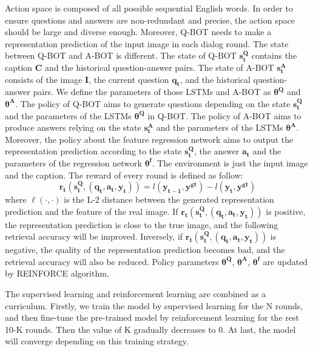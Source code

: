 \documentclass[review]{elsarticle}
\begin{document}
	Action space is composed of all possible sequential English words. In order to ensure questions and answers are non-redundant and precise, the action space should be large and diverse enough. 
	Moreover, Q-BOT needs to make a representation prediction of the input image in each dialog round. 
	The state between Q-BOT and A-BOT is different. The state of Q-BOT $\mathbf{s^{Q}_{t}}$ contains the caption $\textbf{C}$ and the historical question-answer pairs. The state of A-BOT $\mathbf{s^{A}_{t}}$ consists of the image $\textbf{I}$, the current question $\mathbf{q_{t}}$, and the historical question-answer pairs. 
	We define the parameters of those LSTMs and A-BOT as $\mathbf{\theta^{Q}}$ and $\mathbf{\theta^{A}}$. The policy of Q-BOT aims to generate questions depending on the state $\mathbf{s^{Q}_{t}}$ and the parameters of the LSTMs $\mathbf{\theta^{Q}}$ in Q-BOT. 
	The policy of A-BOT aims to produce answers relying on the state $\mathbf{s^{A}_{t}}$ and the parameters of the LSTMs $\mathbf{\theta^{A}}$. Moreover, the policy about the feature regression network aims to output the representation prediction according to the state $\mathbf{s^{Q}_{t}}$, the answer $\mathbf{a_{t}}$ and the parameters of the regression network $\mathbf{\theta^{f}}$. 
	The environment is just the input image and the caption. The reward of every round is defined as follow:
	\begin{equation}
	\mathbf{r_{t}\left(s_{t}^{Q},\left(q_{t}, a_{t}, y_{t}\right)\right)}=l\left(\mathbf{y_{t-1}, y^{g t}}\right)-l\left(\mathbf{y_{t}, y^{g t}}\right)
	\label{Eq5}
	\end{equation}
	where $\ell(\cdot, \cdot)$ is the L-2 distance between the generated representation prediction and the feature of the real image. If $\mathbf{r_{t}\left(s_{t}^{Q},\left(q_{t}, a_{t}, y_{t}\right)\right)}$ is positive, the representation prediction is close to the true image, and the following retrieval accuracy will be improved.
	Inversely, if $\mathbf{r_{t}\left(s_{t}^{Q},\left(q_{t}, a_{t}, y_{t}\right)\right)}$ is negative, the quality of the representation prediction becomes bad, and the retrieval accuracy will also be reduced. 
	Policy parameters $\mathbf{\theta^{Q}}$, $\mathbf{\theta^{A}}$, $\mathbf{\theta^{f}}$ are updated by REINFORCE \cite{DBLP:journals/ml/Williams92} algorithm.	
    
    The supervised learning and reinforcement learning are combined as a curriculum. Firstly, we train the model by supervised learning for the N rounds, and then fine-tune the pre-trained model by reinforcement learning for the rest 10-K rounds. Then the value of K gradually decreases to 0. At last, the model will converge depending on this training strategy.
	
\end{document}
